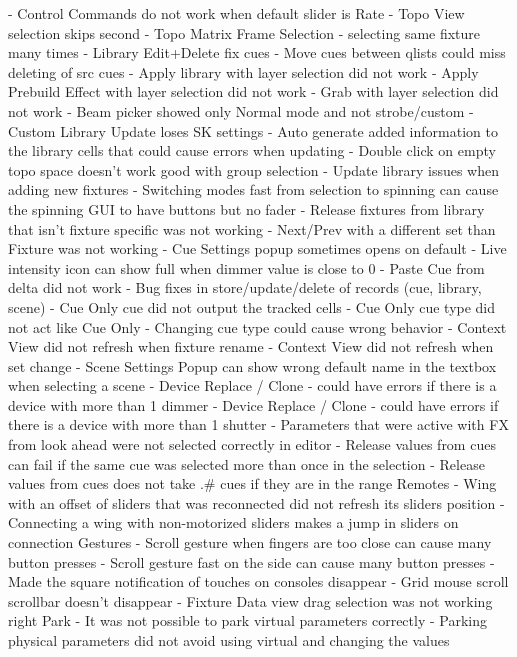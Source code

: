 \documentclass[
]{article}
\begin{document}
- Control Commands do not work when default slider is Rate
- Topo View selection skips second
- Topo Matrix Frame Selection - selecting same fixture many times
- Library Edit+Delete fix cues
- Move cues between qlists could miss deleting of src cues
- Apply library with layer selection did not work
- Apply Prebuild Effect with layer selection did not work
- Grab with layer selection did not work
- Beam picker showed only Normal mode and not strobe/custom
- Custom Library Update loses SK settings
- Auto generate added information to the library cells that could cause errors when updating
- Double click on empty topo space doesn't work good with group selection
- Update library issues when adding new fixtures
- Switching modes fast from selection to spinning can cause the spinning GUI to have buttons but no fader
- Release fixtures from library that isn't fixture specific was not working
- Next/Prev with a different set than Fixture was not working
- Cue Settings popup sometimes opens on default
- Live intensity icon can show full when dimmer value is close to 0
- Paste Cue from delta did not work
- Bug fixes in store/update/delete of records (cue, library, scene)
- Cue Only cue did not output the tracked cells
- Cue Only cue type did not act like Cue Only
- Changing cue type could cause wrong behavior
- Context View did not refresh when fixture rename
- Context View did not refresh when set change
- Scene Settings Popup can show wrong default name in the textbox when selecting a scene
- Device Replace / Clone - could have errors if there is a device with more than 1 dimmer
- Device Replace / Clone - could have errors if there is a device with more than 1 shutter
- Parameters that were active with FX from look ahead were not selected correctly in editor
- Release values from cues can fail if the same cue was selected more than once in the selection
- Release values from cues does not take .\# cues if they are in the range
Remotes
- Wing with an offset of sliders that was reconnected did not refresh its sliders position
- Connecting a wing with non-motorized sliders makes a jump in sliders on connection
Gestures
- Scroll gesture when fingers are too close can cause many button presses
- Scroll gesture fast on the side can cause many button presses
- Made the square notification of touches on consoles disappear
- Grid mouse scroll scrollbar doesn't disappear
- Fixture Data view drag selection was not working right
Park
- It was not possible to park virtual parameters correctly
- Parking physical parameters did not avoid using virtual and changing the values
\end{document}
